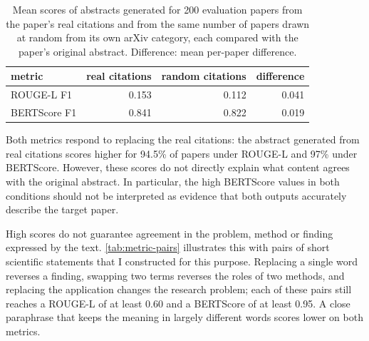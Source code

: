 \begin{table}[!ht]
  \centering
  \begin{tabular}{@{}lrrr@{}}
    \toprule
    metric & real citations & random citations & difference \\
    \midrule
    ROUGE-L F1 & 0.153 & 0.112 & 0.041 \\
    BERTScore F1 & 0.841 & 0.822 & 0.019 \\
    \bottomrule
  \end{tabular}
  \caption{Mean scores of abstracts generated for 200 evaluation papers from the paper's real citations and from the same number of papers drawn at random from its own arXiv category, each compared with the paper's original abstract. Difference: mean per-paper difference.}
  \label{tab:metric-check}
\end{table}

Both metrics respond to replacing the real citations: the abstract generated from real citations scores higher for 94.5\% of papers under ROUGE-L and 97\% under BERTScore. However, these scores do not directly explain what content agrees with the original abstract. In particular, the high BERTScore values in both conditions should not be interpreted as evidence that both outputs accurately describe the target paper.

High scores do not guarantee agreement in the problem, method or finding expressed by the text. \autoref{tab:metric-pairs} illustrates this with pairs of short scientific statements that I constructed for this purpose. Replacing a single word reverses a finding, swapping two terms reverses the roles of two methods, and replacing the application changes the research problem; each of these pairs still reaches a ROUGE-L of at least 0.60 and a BERTScore of at least 0.95. A close paraphrase that keeps the meaning in largely different words scores lower on both metrics.

